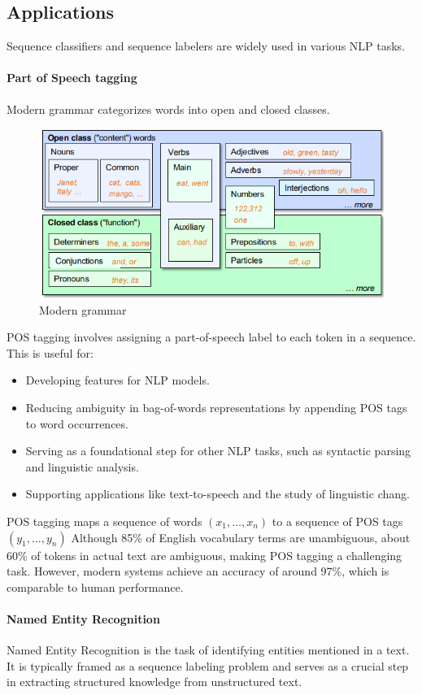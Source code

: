 \subsection{Applications}
Sequence classifiers and sequence labelers are widely used in various NLP tasks.

\paragraph*{Part of Speech tagging}
Modern grammar categorizes words into open and closed classes.
\begin{figure}[H]
    \centering
    \includegraphics[width=0.5\linewidth]{images/nlp2.png}
    \caption{Modern grammar}
\end{figure}
POS tagging involves assigning a part-of-speech label to each token in a sequence. 
This is useful for:
\begin{itemize}
    \item Developing features for NLP models.
    \item Reducing ambiguity in bag-of-words representations by appending POS tags to word occurrences.
    \item Serving as a foundational step for other NLP tasks, such as syntactic parsing and linguistic analysis.
    \item Supporting applications like text-to-speech and the study of linguistic chang.
\end{itemize}
\noindent POS tagging maps a sequence of words $(x_1,\dots,x_n)$ to a sequence of POS tags $(y_1,\dots,y_n)$
Although 85\% of English vocabulary terms are unambiguous, about 60\% of tokens in actual text are ambiguous, making POS tagging a challenging task. 
However, modern systems achieve an accuracy of around 97\%, which is comparable to human performance.

\paragraph*{Named Entity Recognition}
Named Entity Recognition is the task of identifying entities mentioned in a text. 
It is typically framed as a sequence labeling problem and serves as a crucial step in extracting structured knowledge from unstructured text.

